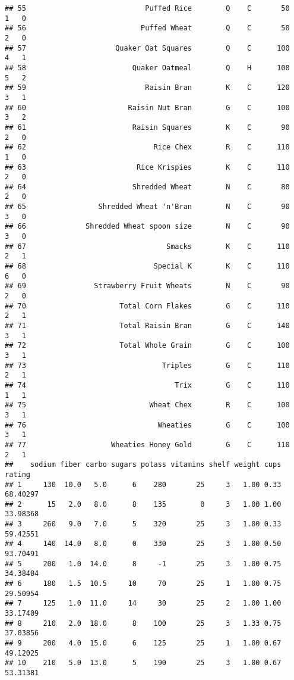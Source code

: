 \documentclass[
]{article}
\begin{document}
\begin{verbatim}
## 55                            Puffed Rice        Q    C       50       1   0
## 56                           Puffed Wheat        Q    C       50       2   0
## 57                     Quaker Oat Squares        Q    C      100       4   1
## 58                         Quaker Oatmeal        Q    H      100       5   2
## 59                            Raisin Bran        K    C      120       3   1
## 60                        Raisin Nut Bran        G    C      100       3   2
## 61                         Raisin Squares        K    C       90       2   0
## 62                              Rice Chex        R    C      110       1   0
## 63                          Rice Krispies        K    C      110       2   0
## 64                         Shredded Wheat        N    C       80       2   0
## 65                 Shredded Wheat 'n'Bran        N    C       90       3   0
## 66              Shredded Wheat spoon size        N    C       90       3   0
## 67                                 Smacks        K    C      110       2   1
## 68                              Special K        K    C      110       6   0
## 69                Strawberry Fruit Wheats        N    C       90       2   0
## 70                      Total Corn Flakes        G    C      110       2   1
## 71                      Total Raisin Bran        G    C      140       3   1
## 72                      Total Whole Grain        G    C      100       3   1
## 73                                Triples        G    C      110       2   1
## 74                                   Trix        G    C      110       1   1
## 75                             Wheat Chex        R    C      100       3   1
## 76                               Wheaties        G    C      100       3   1
## 77                    Wheaties Honey Gold        G    C      110       2   1
##    sodium fiber carbo sugars potass vitamins shelf weight cups   rating
## 1     130  10.0   5.0      6    280       25     3   1.00 0.33 68.40297
## 2      15   2.0   8.0      8    135        0     3   1.00 1.00 33.98368
## 3     260   9.0   7.0      5    320       25     3   1.00 0.33 59.42551
## 4     140  14.0   8.0      0    330       25     3   1.00 0.50 93.70491
## 5     200   1.0  14.0      8     -1       25     3   1.00 0.75 34.38484
## 6     180   1.5  10.5     10     70       25     1   1.00 0.75 29.50954
## 7     125   1.0  11.0     14     30       25     2   1.00 1.00 33.17409
## 8     210   2.0  18.0      8    100       25     3   1.33 0.75 37.03856
## 9     200   4.0  15.0      6    125       25     1   1.00 0.67 49.12025
## 10    210   5.0  13.0      5    190       25     3   1.00 0.67 53.31381

\end{verbatim}
\end{document}
